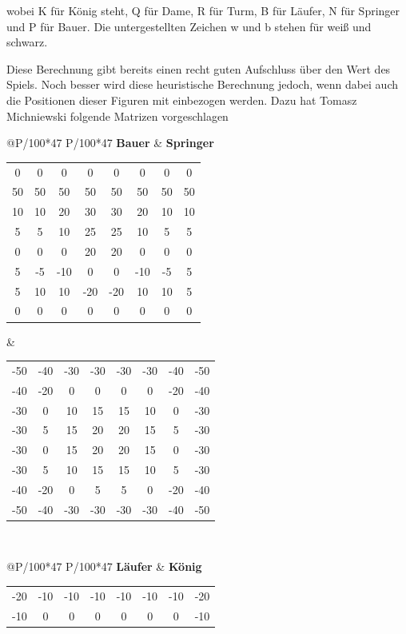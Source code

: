 
wobei K für König steht, Q für Dame, R für Turm, B für Läufer, N für Springer und P für Bauer. Die untergestellten Zeichen w und b stehen für weiß und schwarz.

Diese Berechnung gibt bereits einen recht guten Aufschluss über den Wert des Spiels. Noch besser wird diese heuristische Berechnung jedoch, wenn dabei auch die Positionen dieser Figuren mit einbezogen werden. Dazu hat Tomasz Michniewski folgende Matrizen vorgeschlagen \cite{O.V.2019a}

\begin{table}[htbp]
\tiny
{}
\begin{tabular}{@{}P{\textwidth/100*47} P{\textwidth/100*47}}
\textbf{Bauer} & \textbf{Springer}\\
\begin{tabular}{@{}c c c c c c c c}
0&0&0&0&0&0&0&0\\
50&50&50&50&50&50&50&50\\
10&10&20&30&30&20&10&10\\
5&5&10&25&25&10&5&5\\
0&0&0&20&20&0&0&0\\
5&-5&-10&0&0&-10&-5&5\\
5&10&10&-20&-20&10&10&5\\
0&0&0&0&0&0&0&0
\end{tabular}
&
\begin{tabular}{c c c c c c c c}
-50&-40&-30&-30&-30&-30&-40&-50\\
-40&-20&0&0&0&0&-20&-40\\
-30&0&10&15&15&10&0&-30\\
-30&5&15&20&20&15&5&-30\\
-30&0&15&20&20&15&0&-30\\
-30&5&10&15&15&10&5&-30\\
-40&-20&0&5&5&0&-20&-40\\
-50&-40&-30&-30&-30&-30&-40&-50\\
\end{tabular}
\end{tabular}\\
\begin{tabular}{@{}P{\textwidth/100*47} P{\textwidth/100*47}}
\textbf{Läufer} & \textbf{König}\\
\begin{tabular}{@{}c c c c c c c c}
-20&-10&-10&-10&-10&-10&-10&-20\\
-10&0&0&0&0&0&0&-10\\

\end{tabular}
\end{tabular}
\end{table}
